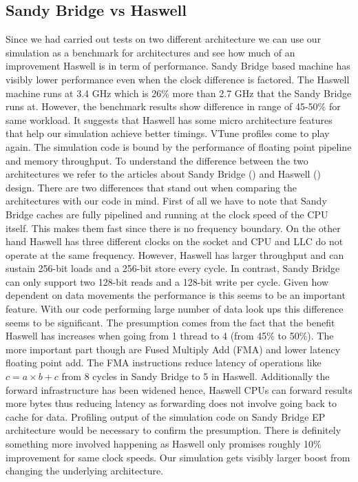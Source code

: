 \documentclass[12pt, a4paper]{report}
\begin{document}
\subsection{Sandy Bridge vs Haswell}\label{subsec:sb-vs-haswell}
Since we had carried out tests on two different architecture we can use our
simulation as a benchmark for architectures and see how much of an improvement
Haswell is in term of performance. Sandy Bridge based machine has visibly
lower performance even when the clock difference is factored. The Haswell
machine runs at 3.4 GHz which is 26\% more than 2.7 GHz that the Sandy Bridge
runs at. However, the benchmark results show difference in range of 45-50\%
for same workload. It suggests that Haswell has some micro architecture
features that help our simulation achieve better timings. VTune profiles
come to play again. The simulation code is bound by the performance
of floating point pipeline and memory throughput. To understand the difference
between the two architectures we refer to the articles about
Sandy Bridge (\cite{SandyBridgeArch}) and Haswell (\cite{HaswellArch}) design. There are two
differences that stand out when comparing the architectures with our code in mind.
First of all we have to note that Sandy Bridge caches are fully pipelined
and running at the clock speed of the CPU itself. This makes them fast since
there is no frequency boundary. On the other hand Haswell has three different
clocks on the socket and CPU and LLC do not operate at the same frequency.
However, Haswell has larger throughput and can sustain 256-bit loads and a
256-bit store every cycle. In contrast, Sandy Bridge can only support two
128-bit reads and a 128-bit write per cycle. Given how dependent on data
movements the performance is this seems to be an important feature. With our
code performing large number of data look ups this difference seems to be
significant. The presumption comes from the fact that the benefit Haswell
has increases when going from 1 thread to 4 (from 45\% to 50\%). The more
important part though are Fused Multiply Add (FMA) and lower latency floating
point add. The FMA instructions reduce latency of operations like
$c = a \times b + c$ from 8 cycles in Sandy Bridge to 5 in Haswell.
Additionally the forward infrastructure has been widened hence,
Haswell CPUs can forward results more bytes thus reducing latency as
forwarding does not involve going back to cache for data.
Profiling output of the simulation code on Sandy Bridge EP
architecture would be necessary to confirm the presumption. There is
definitely something more involved happening as Haswell only promises
roughly 10\% improvement for same clock speeds. Our simulation gets
visibly larger boost from changing the underlying architecture.
\end{document}
